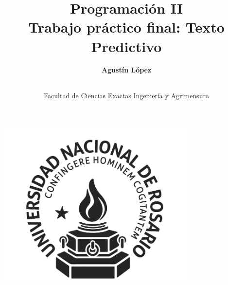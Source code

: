 \title{\huge\bf Programación II\\[0.5cm]
        \bf\Large Trabajo práctico final: Texto Predictivo
        }
\author{\large\bf  Agustín López\\ \ \\}
\date{\large 
Facultad de Ciencias Exactas Ingeniería y Agrimensura}

\makeatletter
    \begin{titlepage}
        \begin{center}
	   { \includegraphics[width=10cm]{unr.png}}
	   {\ \\ \ \\}
        \vbox{}\vspace{2cm}
            {\@title}\\[3cm] 
            {\@author}
            {\@date\\}

        \end{center}
    \end{titlepage}
\makeatother
